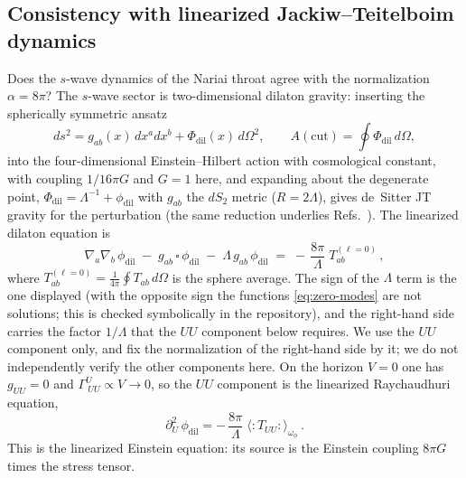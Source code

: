\documentclass[11pt]{article}
\begin{document}
\subsection{Consistency with linearized Jackiw--Teitelboim dynamics}
\label{sec:JT}

Does the $s$-wave dynamics of the Nariai throat agree with the normalization $\alpha=8\pi$? The $s$-wave sector is two-dimensional dilaton gravity: inserting the spherically symmetric ansatz
\begin{equation}
ds^2 = g_{ab}(x)\, dx^a dx^b + \Phi_{\mathrm{dil}}(x)\, d\Omega^2,
\qquad
A(\mathrm{cut}) = \oint \Phi_{\mathrm{dil}}\, d\Omega ,
\label{eq:JT-ansatz}
\end{equation}
into the four-dimensional Einstein--Hilbert action with cosmological constant, with coupling $1/16\pi G$ and $G=1$ here, and expanding about the degenerate point, $\Phi_{\mathrm{dil}} = \Lambda^{-1} + \phi_{\mathrm{dil}}$ with $g_{ab}$ the $dS_2$ metric ($R = 2\Lambda$), gives de~Sitter JT gravity for the perturbation \cite{MertensTuriaci} (the same reduction underlies Refs.~\cite{FanarasVilenkin,Rusalev}). The linearized dilaton equation is
\begin{equation}
\nabla_a \nabla_b\, \phi_{\mathrm{dil}} \;-\; g_{ab}\,\square\, \phi_{\mathrm{dil}} \;-\; \Lambda\, g_{ab}\, \phi_{\mathrm{dil}}
\;=\; -\,\frac{8\pi}{\Lambda}\; T^{(\ell=0)}_{ab}\,,
\label{eq:JT-eom}
\end{equation}
where $T^{(\ell=0)}_{ab}=\frac{1}{4\pi}\oint T_{ab}\,d\Omega$ is the sphere average. The sign of the $\Lambda$ term is the one displayed (with the opposite sign the functions \eqref{eq:zero-modes} are not solutions; this is checked symbolically in the repository), and the right-hand side carries the factor $1/\Lambda$ that the $UU$ component below requires. We use the $UU$ component only, and fix the normalization of the right-hand side by it; we do not independently verify the other components here. On the horizon $V=0$ one has $g_{UU}=0$ and $\Gamma^U_{\ UU}\propto V\to0$, so the $UU$ component is the linearized Raychaudhuri equation,
\begin{equation}
\partial_U^2\, \phi_{\mathrm{dil}}
= -\,\frac{8\pi}{\Lambda}\; \langle{:}T_{UU}{:}\rangle_{\omega_\phi}\,.
\label{eq:JT-null}
\end{equation}
This is the linearized Einstein equation: its source is the Einstein coupling $8\pi G$ times the stress tensor.
\end{document}
